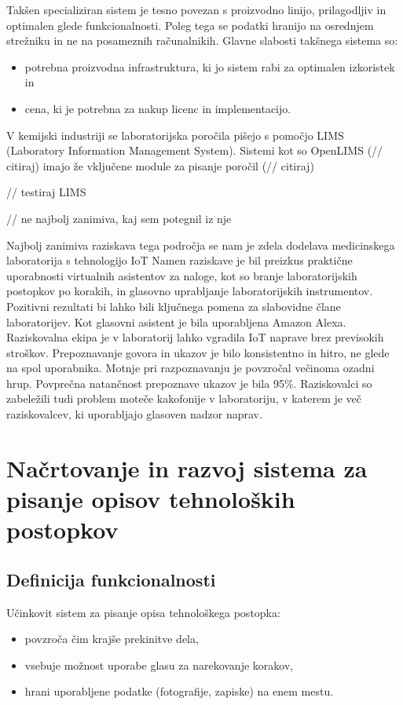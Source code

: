 \documentclass[a4paper, 12pt]{book}
\begin{document}
Takšen specializiran sistem je tesno povezan s proizvodno linijo, prilagodljiv in optimalen glede funkcionalnosti.
Poleg tega se podatki hranijo na osrednjem strežniku in ne na posameznih računalnikih.
Glavne slabosti takšnega sistema so:
\begin{itemize}
	\item potrebna proizvodna infrastruktura, ki jo sistem rabi za optimalen izkoristek in
	\item cena, ki je potrebna za nakup licenc in implementacijo.
\end{itemize}

V kemijski industriji se laboratorijska poročila pišejo s pomočjo LIMS (Laboratory Information Management System).
Sistemi kot so OpenLIMS (// citiraj) imajo že vključene module za pisanje poročil (// citiraj)

// testiraj LIMS 


// ne najbolj zanimiva, kaj sem potegnil iz nje 

Najbolj zanimiva raziskava tega področja se nam je zdela dodelava medicinskega laboratorija s tehnologijo IoT %
Namen raziskave je bil preizkus praktične uporabnosti virtualnih asistentov za naloge, kot so branje laboratorijskih postopkov po korakih, in glasovno uprabljanje laboratorijskih instrumentov.
Pozitivni rezultati bi lahko bili ključnega pomena za slabovidne člane laboratorijev.
Kot glasovni asistent je bila uporabljena Amazon Alexa.
Raziskovalna ekipa je v laboratorij lahko vgradila IoT naprave brez previsokih stroškov.
Prepoznavanje govora in ukazov je bilo konsistentno in hitro, ne glede na spol uporabnika.
Motnje pri razpoznavanju je povzročal večinoma ozadni hrup.
Povprečna natančnost prepoznave ukazov je bila 95\%.
Raziskovalci so zabeležili tudi problem moteče kakofonije v laboratoriju, v katerem je več raziskovalcev, ki uporabljajo glasoven nadzor naprav.


\chapter{Načrtovanje in razvoj sistema za pisanje opisov tehnoloških postopkov}

\section{Definicija funkcionalnosti}

Učinkovit sistem za pisanje opisa tehnološkega postopka:
\begin{itemize}
	\item povzroča čim krajše prekinitve dela,
	\item vsebuje možnost uporabe glasu za narekovanje korakov,
	\item hrani uporabljene podatke (fotografije, zapiske) na enem mestu.
\end{itemize}
\end{document}

